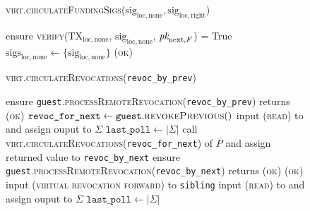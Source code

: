 \begin{figure}[H]
\begin{processbox}{\textsc{virt.circulateFundingSigs}($\mathrm{sig}_{\mathrm{loc},
  \mathrm{none}}, \mathrm{sig}_{\mathrm{loc}, \mathrm{right}}$)}
\begin{algorithmic}[1]
        \State ensure \textsc{verify}($\mathrm{TX}_{\mathrm{loc},
        \mathrm{none}}$, $\mathrm{sig}_{\mathrm{loc}, \mathrm{none}}$,
        $\textit{pk}_{\mathrm{next}, F}$) = True 
        \label{code:virtual-layer:funding-sigs:funder-verify}
        \State $\mathrm{sigs}_{\mathrm{loc}, \mathrm{none}} \gets \{
        \mathrm{sig}_{\mathrm{loc}, \mathrm{none}} \}$
        \State \Return (\textsc{ok})
      \EndIf
    \end{algorithmic}
  \end{processbox}
  \caption{}
  \label{code:virtual-layer:funding-sigs}
\end{figure}

\begin{figure}[H]
  \begin{processbox}{\textsc{virt.circulateRevocations}(\texttt{revoc\_by\_prev})}
    \begin{algorithmic}[1]
     
      \State ensure
      \texttt{guest}.\textsc{processRemoteRevocation}(\texttt{revoc\_by\_prev})
      returns (\textsc{ok})
      \label{code:virtual-layer:revocation:non-funder:proc-remote}
    \Else \: 
      \State $\texttt{revoc\_for\_next} \gets
      \texttt{guest}.\textsc{revokePrevious}()$
      \State input (\textsc{read}) to \ledger and assign ouput to $\Sigma$
      \State $\texttt{last\_poll} \gets |\Sigma|$
      \State call \textsc{virt.circulateRevocations}(\texttt{revoc\_for\_next})
      of $\bar{P}$ and assign returned value to \texttt{revoc\_by\_next}
      \label{code:virtual-layer:revocation:revoc-by-next}
      \State ensure
      \texttt{guest}.\textsc{processRemoteRevocation}(\texttt{revoc\_by\_next})
      returns (\textsc{ok}) 
      \label{code:virtual-layer:revocation:funder:proc-remote}
      \State \Return (\textsc{ok})
    \EndIf
     
      \State input (\textsc{virtual revocation forward}) to \texttt{sibling}
      \State {}
      \State input (\textsc{read}) to \ledger and assign ouput to $\Sigma$
      \State $\texttt{last\_poll} \gets |\Sigma|$
      \State {}
\end{algorithmic}
\end{processbox}
\end{figure}
